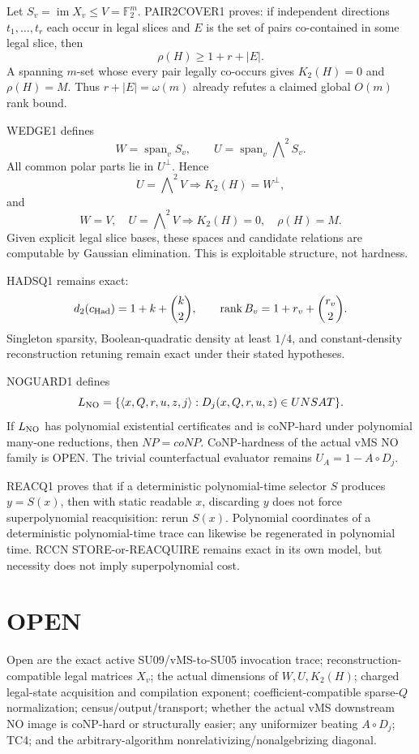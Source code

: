 \documentclass[11pt]{article}
\begin{document}
Let \(S_v=\operatorname{im}X_v\le V=\mathbb F_2^m\). PAIR2COVER1 proves: if independent directions \(t_1,\dots,t_r\) each occur in legal slices and \(E\) is the set of pairs co-contained in some legal slice, then
\[
\boxed{\rho(H)\ge 1+r+|E|}.
\]
A spanning \(m\)-set whose every pair legally co-occurs gives \(K_2(H)=0\) and \(\rho(H)=M\). Thus \(r+|E|=\omega(m)\) already refutes a claimed global \(O(m)\) rank bound.

WEDGE1 defines
\[
W=\operatorname{span}_vS_v,\qquad U=\operatorname{span}_v\bigwedge\nolimits^2S_v.
\]
All common polar parts lie in \(U^\perp\). Hence
\[
\boxed{U=\bigwedge\nolimits^2V\Longrightarrow K_2(H)=W^\perp},
\]
and
\[
\boxed{W=V,\quad U=\bigwedge\nolimits^2V\Longrightarrow K_2(H)=0,\quad \rho(H)=M}.
\]
Given explicit legal slice bases, these spaces and candidate relations are computable by Gaussian elimination. This is exploitable structure, not hardness.

HADSQ1 remains exact:
\[
d_2(c_{\rm Had})=1+k+\binom k2,\qquad
\operatorname{rank}B_v=1+r_v+\binom{r_v}{2}.
\]
Singleton sparsity, Boolean-quadratic density at least \(1/4\), and constant-density reconstruction retuning remain exact under their stated hypotheses.

NOGUARD1 defines
\[
L_{\rm NO}=\{\langle x,Q,r,u,z,j\rangle:D_j(x,Q,r,u,z)\in UNSAT\}.
\]
If \(L_{\rm NO}\) has polynomial existential certificates and is coNP-hard under polynomial many-one reductions, then \(NP=coNP\). CoNP-hardness of the actual vMS NO family is OPEN. The trivial counterfactual evaluator remains \(U_A=1-A\circ D_j\).

REACQ1 proves that if a deterministic polynomial-time selector \(S\) produces \(y=S(x)\), then with static readable \(x\), discarding \(y\) does not force superpolynomial reacquisition: rerun \(S(x)\). Polynomial coordinates of a deterministic polynomial-time trace can likewise be regenerated in polynomial time. RCCN STORE-or-REACQUIRE remains exact in its own model, but necessity does not imply superpolynomial cost.

\section*{OPEN}
Open are the exact active SU09/vMS-to-SU05 invocation trace; reconstruction-compatible legal matrices \(X_v\); the actual dimensions of \(W,U,K_2(H)\); charged legal-state acquisition and compilation exponent; coefficient-compatible sparse-\(Q\) normalization; census/output/transport; whether the actual vMS downstream NO image is coNP-hard or structurally easier; any uniformizer beating \(A\circ D_j\); TC4; and the arbitrary-algorithm nonrelativizing/nonalgebrizing diagonal.
\end{document}
